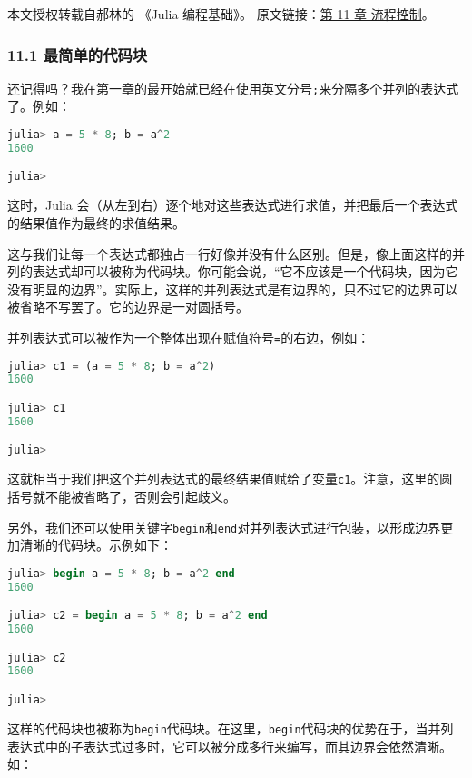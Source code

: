 
本文授权转载自郝林的 《Julia 编程基础》。 原文链接：\href{https://github.com/hyper0x/JuliaBasics/blob/master/book/ch11.md}{第 11 章 流程控制}。

\subsubsection{11.1 最简单的代码块}

还记得吗？我在第一章的最开始就已经在使用英文分号\verb|;|来分隔多个并列的表达式了。例如：

\begin{lstlisting}[language=julia]
julia> a = 5 * 8; b = a^2
1600

julia> 
\end{lstlisting}

这时，Julia 会（从左到右）逐个地对这些表达式进行求值，并把最后一个表达式的结果值作为最终的求值结果。

这与我们让每一个表达式都独占一行好像并没有什么区别。但是，像上面这样的并列的表达式却可以被称为代码块。你可能会说，“它不应该是一个代码块，因为它没有明显的边界”。实际上，这样的并列表达式是有边界的，只不过它的边界可以被省略不写罢了。它的边界是一对圆括号。

并列表达式可以被作为一个整体出现在赋值符号\verb|=|的右边，例如：

\begin{lstlisting}[language=julia]
julia> c1 = (a = 5 * 8; b = a^2)
1600

julia> c1
1600

julia> 
\end{lstlisting}

这就相当于我们把这个并列表达式的最终结果值赋给了变量\verb|c1|。注意，这里的圆括号就不能被省略了，否则会引起歧义。

另外，我们还可以使用关键字\verb|begin|和\verb|end|对并列表达式进行包装，以形成边界更加清晰的代码块。示例如下：

\begin{lstlisting}[language=julia]
julia> begin a = 5 * 8; b = a^2 end
1600

julia> c2 = begin a = 5 * 8; b = a^2 end
1600

julia> c2
1600

julia> 
\end{lstlisting}

这样的代码块也被称为\verb|begin|代码块。在这里，\verb|begin|代码块的优势在于，当并列表达式中的子表达式过多时，它可以被分成多行来编写，而其边界会依然清晰。如：


